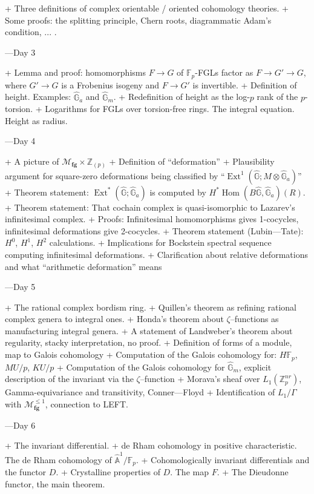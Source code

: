 \documentclass[12pt]{book}
\newcommand{\Z}{\mathbb Z}
\newcommand{\F}{\mathbb F}
\newcommand{\G}{\widehat{\mathbb G}}
\newcommand{\A}{\widehat{\mathbb{A}}}
\newcommand{\<}{\langle}
\renewcommand{\>}{\rangle}
\newcommand{\moduli}[1]{\mathcal{M}_{\mathbf{#1}}}
\DeclareMathOperator{\Ext}{Ext}
\numberwithin{equation}{section}
\theoremstyle{plain}
\theoremstyle{definition}
\theoremstyle{remark}
\begin{document}
+ Three definitions of complex orientable / oriented cohomology theories.
+ Some proofs: the splitting principle, Chern roots, diagrammatic Adam's condition, ... .

---Day 3

+ Lemma and proof: homomorphisms $F \to G$ of $\F_p$-FGLs factor as $F \to G' \to G$, where $G' \to G$ is a Frobenius isogeny and $F \to G'$ is invertible.
+ Definition of height.  Examples: $\G_a$ and $\G_m$.
+ Redefinition of height as the log-$p$ rank of the $p$-torsion.
+ Logarithms for FGLs over torsion-free rings.  The integral equation.  Height as radius.

---Day 4

+ A picture of $\moduli{fg} \times \Z_{(p)}$
+ Definition of ``deformation''
+ Plausibility argument for square-zero deformations being classified by ``$\Ext^1(\G; M \otimes \G_a)$''
+ Theorem statement: $\Ext^*(\G; \G_a)$ is computed by $H^* \operatorname{Hom}(B\G, \G_a)(R)$.
+ Theorem statement: That cochain complex is quasi-isomorphic to Lazarev's infinitesimal complex.
+ Proofs: Infinitesimal homomorphisms gives 1-cocycles, infinitesimal deformations give 2-cocycles.
+ Theorem statement (Lubin—Tate): $H^0$, $H^1$, $H^2$ calculations.
+ Implications for Bockstein spectral sequence computing infinitesimal deformations.
+ Clarification about relative deformations and what ``arithmetic deformation'' means

---Day 5

+ The rational complex bordism ring.
+ Quillen’s theorem as refining rational complex genera to integral ones.
+ Honda’s theorem about $\zeta$--functions as manufacturing integral genera.
+ A statement of Landweber's theorem about regularity, stacky interpretation, no proof.
+ Definition of forms of a module, map to Galois cohomology
+ Computation of the Galois cohomology for: $H\F_p$, $MU/p$, $KU/p$
+ Computation of the Galois cohomology for $\G_m$, explicit description of the invariant via the $\zeta$--function
+ Morava’s sheaf over $L_1(\Z_p^{nr})$, Gamma-equivariance and transitivity, Conner—Floyd
+ Identification of $L_1 / \Gamma$ with $\moduli{fg}^{\le 1}$, connection to LEFT.

---Day 6

+ The invariant differential.
+ de Rham cohomology in positive characteristic.  The de Rham cohomology of $\A^1 / \F_p$.
+ Cohomologically invariant differentials and the functor $D$.
+ Crystalline properties of $D$.  The map $F$.
+ The Dieudonne functor, the main theorem.
\end{document}
